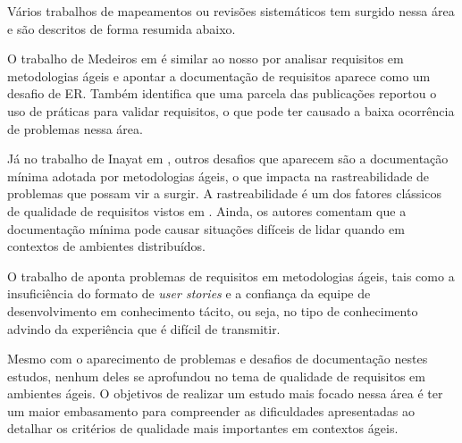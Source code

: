 Vários trabalhos de mapeamentos ou revisões sistemáticos tem surgido nessa área e são descritos de forma resumida abaixo.

O trabalho de Medeiros em \cite{Medeiros_2015} é similar ao nosso por analisar requisitos em metodologias ágeis e apontar a documentação de requisitos aparece como um desafio de ER. Também identifica que uma parcela das publicações reportou o uso de práticas para validar requisitos, o que pode ter causado a baixa ocorrência de problemas nessa área. 

Já no trabalho de Inayat em \cite{Inayat_2015}, outros desafios que aparecem são a documentação mínima adotada por metodologias ágeis, o que impacta na rastreabilidade de problemas que possam vir a surgir. A rastreabilidade é um dos fatores clássicos de qualidade de requisitos vistos em \cite{Babok_2015}. Ainda, os autores comentam que a documentação mínima pode causar situações difíceis de lidar quando em contextos de ambientes distribuídos.

O trabalho de \cite{Heikkil_2015} aponta problemas de requisitos em metodologias ágeis, tais como a insuficiência do formato de \textit{user stories} e a confiança da equipe de desenvolvimento em conhecimento tácito, ou seja, no tipo de conhecimento advindo da experiência que é difícil de transmitir.

Mesmo com o aparecimento de problemas e desafios de documentação nestes estudos, nenhum deles se aprofundou no tema de qualidade de requisitos em ambientes ágeis. O objetivos de realizar um estudo mais focado nessa área é ter um maior embasamento para compreender as dificuldades apresentadas ao detalhar os critérios de qualidade mais importantes em contextos ágeis.